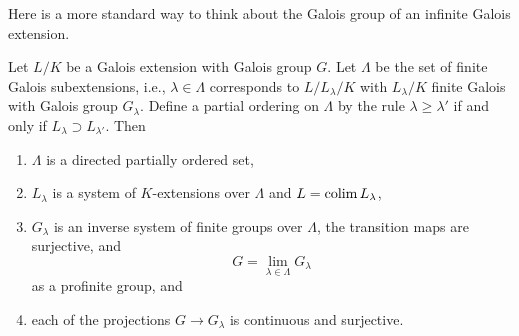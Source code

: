 \noindent
Here is a more standard way to think about
the Galois group of an infinite Galois extension.

\begin{lemma}
\label{lemma-infinite-galois-limit}
Let $L/K$ be a Galois extension with Galois group $G$.
Let $\Lambda$ be the set of finite Galois subextensions,
i.e., $\lambda \in \Lambda$ corresponds to $L/L_\lambda/K$
with $L_\lambda/K$ finite Galois with Galois group $G_\lambda$.
Define a partial ordering on $\Lambda$ by the rule
$\lambda \geq \lambda'$ if and only if
$L_\lambda \supset L_{\lambda'}$. Then
\begin{enumerate}
\item $\Lambda$ is a directed partially ordered set,
\item $L_\lambda$ is a system of $K$-extensions over $\Lambda$
and $L = \mathop{\mathrm{colim}}\nolimits L_\lambda$,
\item $G_\lambda$ is an inverse system of finite groups over $\Lambda$,
the transition maps are surjective, and
$$
G = \lim_{\lambda \in \Lambda} G_\lambda
$$
as a profinite group, and
\item each of the projections $G \to G_\lambda$ is continuous and surjective.
\end{enumerate}
\end{lemma}


